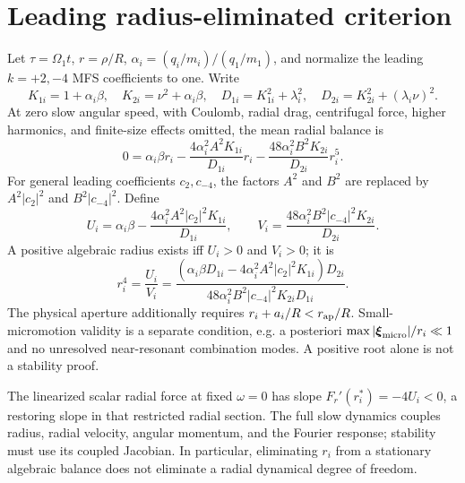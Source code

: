 \section{Leading radius-eliminated criterion}
Let $\tau=\Omega_1t$, $r=\rho/R$, $\alpha_i=(q_i/m_i)/(q_1/m_1)$,
and normalize the leading $k=+2,-4$ MFS coefficients to one. Write
\begin{equation}
K_{1i}=1+\alpha_i\beta,\quad K_{2i}=\nu^2+\alpha_i\beta,\quad
D_{1i}=K_{1i}^2+\lambda_i^2,\quad
D_{2i}=K_{2i}^2+(\lambda_i\nu)^2.
\end{equation}
At zero slow angular speed, with Coulomb, radial drag, centrifugal force,
higher harmonics, and finite-size effects omitted, the mean radial balance is
\begin{equation}
0=\alpha_i\beta r_i-
\frac{4\alpha_i^2A^2K_{1i}}{D_{1i}}r_i-
\frac{48\alpha_i^2B^2K_{2i}}{D_{2i}}r_i^5.
\end{equation}
For general leading coefficients $c_2,c_{-4}$, the factors $A^2$ and $B^2$
are replaced by $A^2|c_2|^2$ and $B^2|c_{-4}|^2$. Define
\begin{equation}
U_i=\alpha_i\beta-\frac{4\alpha_i^2A^2|c_2|^2K_{1i}}{D_{1i}},\qquad
V_i=\frac{48\alpha_i^2B^2|c_{-4}|^2K_{2i}}{D_{2i}}.
\end{equation}
A positive algebraic radius exists iff $U_i>0$ and $V_i>0$; it is
\begin{equation}
r_i^4=\frac{U_i}{V_i}=
\frac{\left(\alpha_i\beta D_{1i}-4\alpha_i^2A^2|c_2|^2K_{1i}\right)D_{2i}}
{48\alpha_i^2B^2|c_{-4}|^2K_{2i}D_{1i}}.
\end{equation}
The physical aperture additionally requires $r_i+a_i/R<r_{\rm ap}/R$.
Small-micromotion validity is a separate condition, e.g. a posteriori
$\max|\boldsymbol\xi_{\rm micro}|/r_i\ll1$ and no unresolved near-resonant
combination modes. A positive root alone is not a stability proof.

The linearized scalar radial force at fixed $\omega=0$ has slope
$F_r'(r_i^*)=-4U_i<0$, a restoring slope in that restricted radial section.
The full slow dynamics couples radius, radial velocity, angular momentum, and
the Fourier response; stability must use its coupled Jacobian. In particular,
eliminating $r_i$ from a stationary algebraic balance does not eliminate a
radial dynamical degree of freedom.

